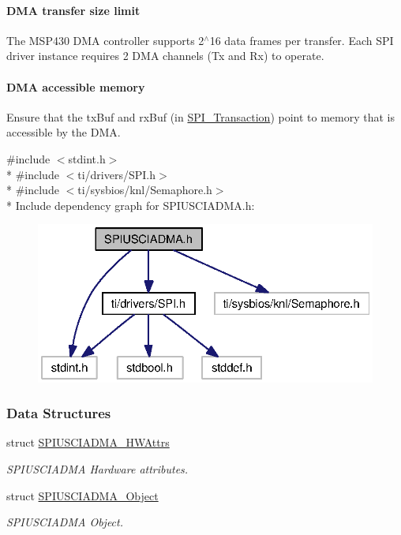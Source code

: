 \paragraph*{D\+M\+A transfer size limit}

The M\+S\+P430 D\+M\+A controller supports 2$^\wedge$16 data frames per transfer. Each S\+P\+I driver instance requires 2 D\+M\+A channels (Tx and Rx) to operate.

\paragraph*{D\+M\+A accessible memory}

Ensure that the tx\+Buf and rx\+Buf (in \hyperlink{struct_s_p_i___transaction}{S\+P\+I\+\_\+\+Transaction}) point to memory that is accessible by the D\+M\+A. 

{\ttfamily \#include $<$stdint.\+h$>$}\\*
{\ttfamily \#include $<$ti/drivers/\+S\+P\+I.\+h$>$}\\*
{\ttfamily \#include $<$ti/sysbios/knl/\+Semaphore.\+h$>$}\\*
Include dependency graph for S\+P\+I\+U\+S\+C\+I\+A\+D\+M\+A.\+h\+:
\nopagebreak
\begin{figure}[H]
\begin{center}
\leavevmode
\includegraphics[width=322pt]{_s_p_i_u_s_c_i_a_d_m_a_8h__incl}
\end{center}
\end{figure}
\subsubsection*{Data Structures}
\begin{DoxyCompactItemize}
\item 
struct \hyperlink{struct_s_p_i_u_s_c_i_a_d_m_a___h_w_attrs}{S\+P\+I\+U\+S\+C\+I\+A\+D\+M\+A\+\_\+\+H\+W\+Attrs}
\begin{DoxyCompactList}\small\item\em S\+P\+I\+U\+S\+C\+I\+A\+D\+M\+A Hardware attributes. \end{DoxyCompactList}\item 
struct \hyperlink{struct_s_p_i_u_s_c_i_a_d_m_a___object}{S\+P\+I\+U\+S\+C\+I\+A\+D\+M\+A\+\_\+\+Object}
\begin{DoxyCompactList}\small\item\em S\+P\+I\+U\+S\+C\+I\+A\+D\+M\+A Object. \end{DoxyCompactList}\end{DoxyCompactItemize}
